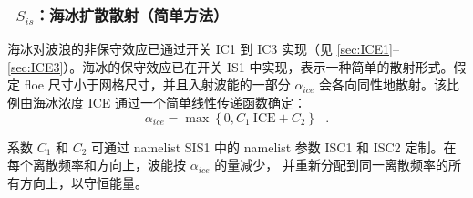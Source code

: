 \vsssub
\subsubsection{~$S_{is}$：海冰扩散散射（简单方法）} \label{sec:IS1}
\vsssub


\noindent
海冰对波浪的非保守效应已通过开关 {\code IC1} 到 {\code IC3} 实现（见
\para\ref{sec:ICE1}--\ref{sec:ICE3}）。海冰的保守效应已在开关 {\code IS1}
中实现，表示一种简单的散射形式。假定 floe 尺寸小于网格尺寸，并且入射波能的一部分
$\alpha_{ice}$ 会各向同性地散射。该比例由海冰浓度 ICE 通过一个简单线性传递函数确定：
\begin{equation}\label{eq:IS101}
     \alpha_{ice} = \max\left \{0 , C_1\ \mathrm{ICE} + C_2 \right \} \:\:\: .
\end{equation}

\noindent
系数 $C_1$ 和 $C_2$ 可通过 namelist {\F SIS1} 中的 namelist 参数 {\code ISC1}
和 {\code ISC2} 定制。在每个离散频率和方向上，波能按 $\alpha_{ice}$ 的量减少，
并重新分配到同一离散频率的所有方向上，以守恒能量。
